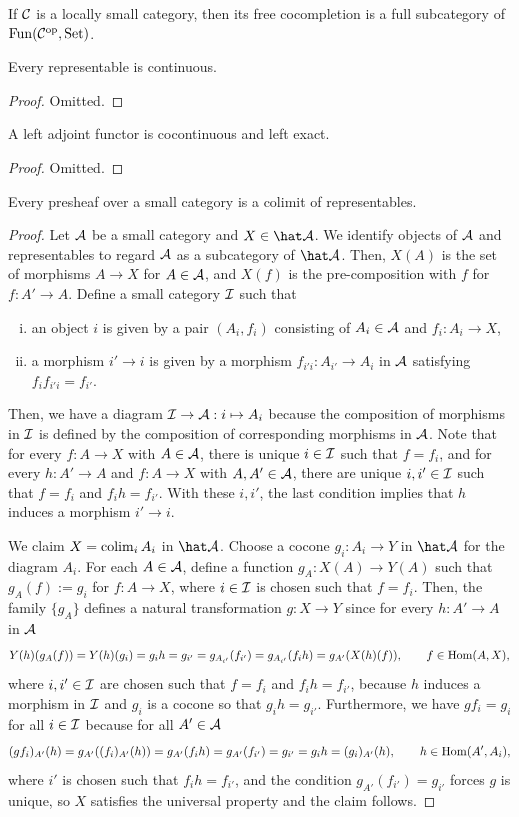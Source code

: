 \documentclass{../../../small}
\begin{document}
If $\mathcal{C}$ is a locally small category, then its free cocompletion is a full subcategory of $\operatorname{Fun}(\mathcal{C}^{\mathrm{op}},\operatorname{Set})$.

\begin{proposition}
Every representable is continuous.
\end{proposition}
\begin{proof}
Omitted.
\end{proof}


\begin{proposition}
A left adjoint functor is cocontinuous and left exact.
\end{proposition}
\begin{proof}
Omitted.
\end{proof}


\begin{proposition}
Every presheaf over a small category is a colimit of representables.
\end{proposition}
\begin{proof}
Let $\mathcal{A}$ be a small category and $X\in\hat\cA$.
We identify objects of $\mathcal{A}$ and representables to regard $\mathcal{A}$ as a subcategory of $\hat\cA$.
Then, $X(A)$ is the set of morphisms $A\to X$ for $A\in\mathcal{A}$, and $X(f)$ is the pre-composition with $f$ for $f:A'\to A$.
Define a small category $\mathcal{I}$ such that
\begin{enumerate}[(i)]
\item an object $i$ is given by a pair $(A_i,f_i)$ consisting of $A_i\in\mathcal{A}$ and $f_i:A_i\to X$,
\item a morphism $i'\to i$ is given by a morphism $f_{i'i}:A_{i'}\to A_i$ in $\mathcal{A}$ satisfying $f_if_{i'i}=f_{i'}$.
\end{enumerate}
Then, we have a diagram $\mathcal{I}\to\mathcal{A}:i\mapsto A_i$ because the composition of morphisms in $\mathcal{I}$ is defined by the composition of corresponding morphisms in $\mathcal{A}$.
Note that for every $f:A\to X$ with $A\in\mathcal{A}$, there is unique $i\in\mathcal{I}$ such that $f=f_i$, and for every $h:A'\to A$ and $f:A\to X$ with $A,A'\in\mathcal{A}$, there are unique $i,i'\in\mathcal{I}$ such that $f=f_i$ and $f_ih=f_{i'}$.
With these $i,i'$, the last condition implies that $h$ induces a morphism $i'\to i$.

We claim $X=\operatorname*{colim}_iA_i$ in $\hat\cA$.
Choose a cocone $g_i:A_i\to Y$ in $\hat\cA$ for the diagram $A_i$.
For each $A\in\mathcal{A}$, define a function $g_A:X(A)\to Y(A)$ such that $g_A(f):=g_i$ for $f:A\to X$, where $i\in\mathcal{I}$ is chosen such that $f=f_i$.
Then, the family $\{g_A\}$ defines a natural transformation $g:X\to Y$ since for every $h:A'\to A$ in $\mathcal{A}$
\[Y(h)(g_A(f))=Y(h)(g_i)=g_ih=g_{i'}=g_{A_{i'}}(f_{i'})=g_{A_{i'}}(f_ih)=g_{A'}(X(h)(f)),\qquad f\in\operatorname{Hom}(A,X),\]
where $i,i'\in\mathcal{I}$ are chosen such that $f=f_i$ and $f_ih=f_{i'}$, because $h$ induces a morphism in $\mathcal{I}$ and $g_i$ is a cocone so that $g_ih=g_{i'}$.
Furthermore, we have $gf_i=g_i$ for all $i\in\mathcal{I}$ because for all $A'\in\mathcal{A}$
\[(gf_i)_{A'}(h)=g_{A'}((f_i)_{A'}(h))=g_{A'}(f_ih)=g_{A'}(f_{i'})=g_{i'}=g_ih=(g_i)_{A'}(h),\qquad h\in\operatorname{Hom}(A',A_i),\]
where $i'$ is chosen such that $f_ih=f_{i'}$, and the condition $g_{A'}(f_{i'})=g_{i'}$ forces $g$ is unique, so $X$ satisfies the universal property and the claim follows.
\end{proof}
\end{document}
